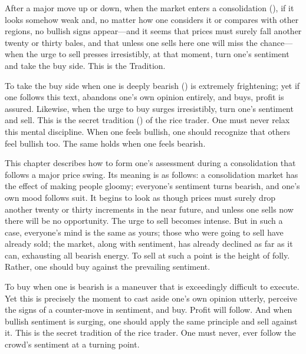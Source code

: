 \begin{sokyubox}
{\small\itshape\color{sokyubar} }

\medskip
After a major move up or down, when the market enters a consolidation
(), if it looks somehow weak and, no matter how one
considers it or compares with other regions, no bullish signs
appear---and it seems that prices must surely fall another twenty or
thirty bales, and that unless one sells here one will miss the
chance---when the urge to sell presses irresistibly, at that moment,
turn one's sentiment and take the buy side. This is the Tradition.

To take the buy side when one is deeply bearish () is
extremely frightening; yet if one follows this text, abandons one's own
opinion entirely, and buys, profit is assured. Likewise, when the urge
to buy surges irresistibly, turn one's sentiment and sell. This is the
secret tradition () of the rice trader. One must never
relax this mental discipline. When one feels bullish, one should
recognize that others feel bullish too. The same holds when one feels
bearish.
\end{sokyubox}

\commentary
This chapter describes how to form one's assessment during a
consolidation that follows a major price swing. Its meaning is as
follows: a consolidation market has the effect of making people gloomy;
everyone's sentiment turns bearish, and one's own mood follows suit. It
begins to look as though prices must surely drop another twenty or thirty
increments in the near future, and unless one sells now there will be no
opportunity. The urge to sell becomes intense. But in such a case,
everyone's mind is the same as yours; those who were going to sell have
already sold; the market, along with sentiment, has already declined as
far as it can, exhausting all bearish energy. To sell at such a point is
the height of folly. Rather, one should buy against the prevailing
sentiment.

To buy when one is bearish is a maneuver that is exceedingly difficult
to execute. Yet this is precisely the moment to cast aside one's own
opinion utterly, perceive the signs of a counter-move in sentiment, and
buy. Profit will follow. And when bullish sentiment is surging, one
should apply the same principle and sell against it. This is the secret
tradition of the rice trader. One must never, ever follow the crowd's
sentiment at a turning point.

